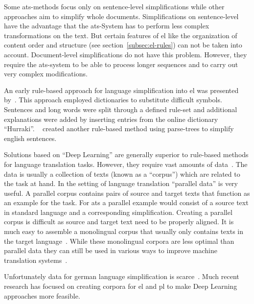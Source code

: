 Some \gls{ats}-methods focus only on sentence-level simplifications while other approaches aim to simplify whole documents.
Simplifications on sentence-level have the advantage that the \gls{ats}-System has to perform less complex transformations on the text.
But certain features of \gls{el} like the organization of content order and structure (see section~\ref{subsec:el-rules}) can not be taken into account. %
Document-level simplifications do not have this problem.
However, they require the \gls{ats}-system to be able to process longer sequences and to carry out very complex modifications.

An early rule-based approach for language simplification into \gls{el} was presented by~\autocite{suter2016}.
This approach employed dictionaries to substitute difficult symbols.
Sentences and long words were split through a defined rule-set and additional explanations were added by inserting entries from the online dictionary \enquote{Hurraki}.
~\autocite{Garain2019} created another rule-based method using parse-trees to simplify english sentences.

Solutions based on \enquote{Deep Learning} are generally superior to rule-based methods for language translation tasks.
However, they require vast amounts of data~\autocite{otter2019survey}.
The data is usually a collection of texts (known as a \enquote{corpus}) which are related to the task at hand.
In the setting of language translation \enquote{parallel data} is very useful.
A parallel corpus contains pairs of source and target texts that function as an example for the task.
For \gls{ats} a parallel example would consist of a source text in standard language and a corresponding simplification.
Creating a parallel corpus is difficult as source and target text need to be properly aligned.
It is much easy to assemble a monolingual corpus that usually only contains texts in the target language~\autocite{chan2023routledge}.
While these monolingual corpora are less optimal than parallel data they can still be used in various ways to improve machine translation systems~\autocite{lample2018unsupervised, burlot2019using, chan2023routledge}.

Unfortunately data for german language simplification is scarce~\autocite{Ansch_tz_2023}.
Much recent research has focused on creating corpora for \gls{el} and \gls{pl} to make Deep Learning approaches more feasible.



